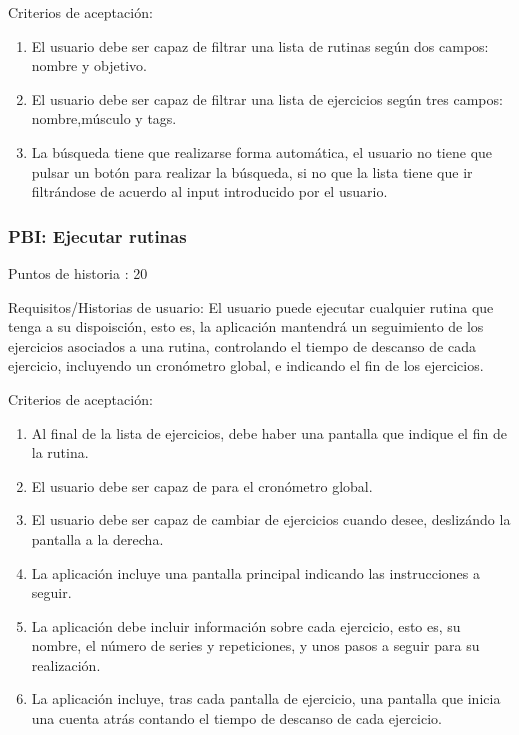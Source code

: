 \documentclass[11pt,a4paper]{report}
\begin{document}
Criterios de aceptación:
\begin{enumerate}
	\item El usuario debe ser capaz de filtrar una lista de rutinas según dos campos: nombre y objetivo.
	
	\item El usuario debe ser capaz de filtrar una lista de ejercicios según tres campos: nombre,músculo y tags.
	
	\item La búsqueda tiene que realizarse forma automática, el usuario no tiene que pulsar un botón para realizar la búsqueda, si no que la lista tiene que ir filtrándose de acuerdo al input introducido por el usuario.
	
\end{enumerate}
\subsubsection{PBI: Ejecutar rutinas}

Puntos de historia : 20

Requisitos/Historias de usuario: El usuario puede ejecutar cualquier rutina que tenga a su dispoisción, esto es, la aplicación mantendrá un seguimiento de los ejercicios asociados a una rutina, controlando el tiempo de descanso de cada ejercicio, incluyendo un cronómetro global, e indicando el fin de los ejercicios.

Criterios de aceptación:
\begin{enumerate}
	\item Al final de la lista de ejercicios, debe haber una pantalla que indique el fin de la rutina.
	
	\item El usuario debe ser capaz de para el cronómetro global.
	
	\item El usuario debe ser capaz de cambiar de ejercicios cuando desee, deslizándo la pantalla a la derecha.
	
	\item La aplicación incluye una pantalla principal indicando las instrucciones a seguir.
	
	\item La aplicación debe incluir información sobre cada ejercicio, esto es, su nombre, el número de series y repeticiones, y unos pasos a seguir para su realización.
	
	\item La aplicación incluye, tras cada pantalla de ejercicio, una pantalla que inicia una cuenta atrás contando el tiempo de descanso de cada ejercicio.
	
\end{enumerate}
\end{document}
